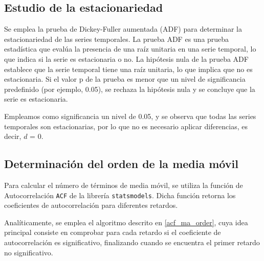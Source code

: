 \subsection{Estudio de la estacionariedad}
Se emplea la prueba de Dickey-Fuller aumentada (ADF) para determinar la estacionariedad de las series temporales.
La prueba ADF es una prueba estadística que evalúa la presencia de una raíz unitaria en una serie temporal, lo que indica si la serie es estacionaria o no.
La hipótesis nula de la prueba ADF establece que la serie temporal tiene una raíz unitaria, lo que implica que no es estacionaria.
Si el valor p de la prueba es menor que un nivel de significancia predefinido (por ejemplo, 0.05), se rechaza la hipótesis nula y se concluye que la serie es estacionaria.

Empleamos como significancia un nivel de 0.05, y se observa que todas las series temporales son estacionarias, por lo que no es necesario aplicar diferencias, 
es decir, $d$ = 0.

\subsection{Determinación del orden de la media móvil}
Para calcular el número de términos de media móvil, se utiliza la función de Autocorrelación \texttt{ACF} de la librería \texttt{statsmodels}. Dicha función 
retorna los coeficientes de autocorrelación para diferentes retardos.

Analíticamente, se emplea el algoritmo descrito en \ref{acf_ma_order}, cuya idea principal consiste en comprobar para cada retardo si el 
coeficiente de autocorrelación es significativo, finalizando cuando se encuentra el primer retardo no significativo. 

